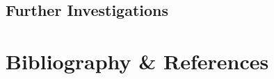 \documentclass{lab}
\begin{document}
	\subsection*{Further Investigations}

	\section*{Bibliography \& References}

	\newpage
	\setcounter{page}{1}
	\listoftables
\end{document}
